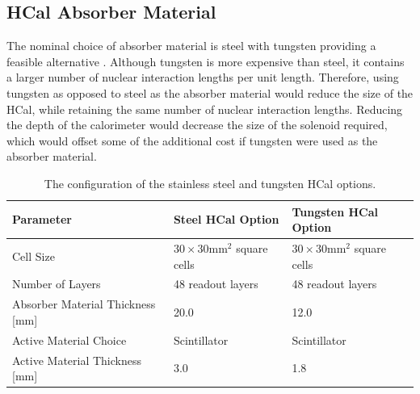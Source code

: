 
\subsection{HCal Absorber Material}
\label{sec:hcalabsorbermaterial}

The nominal choice of absorber material is steel with tungsten providing a feasible alternative \cite{Blaising:2015nla}.  Although tungsten is more expensive than steel, it contains a larger number of nuclear interaction lengths per unit length.  Therefore, using tungsten as opposed to steel as the absorber material would reduce the size of the HCal, while retaining the same number of nuclear interaction lengths.  Reducing the depth of the calorimeter would decrease the size of the solenoid required, which would offset some of the additional cost if tungsten were used as the absorber material. 

\begin{table}[h!]
\centering
\begin{tabular}{ l l l }
\hline
Parameter & Steel HCal Option & Tungsten HCal Option \\
\hline
Cell Size & $30 \times 30 \text{mm}^{2}$ square cells & $30 \times 30 \text{mm}^{2}$ square cells\\
Number of Layers & 48 readout layers & 48 readout layers\\
Absorber Material Thickness [mm] & 20.0 & 12.0 \\
Active Material Choice & Scintillator & Scintillator \\
Active Material Thickness [mm] & 3.0 & 1.8 \\
\hline
\end{tabular}
\caption[The configuration of the stainless steel and tungsten HCal options.]{The configuration of the stainless steel and tungsten HCal options.}
\label{table:hcalabsmaterial}
\end{table}

